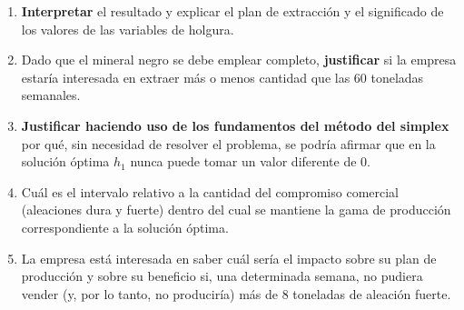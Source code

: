 \begin{enumerate}

\item \textbf{Interpretar} el resultado y explicar el plan de extracción y el significado de los valores de las variables de holgura.


\item Dado que el mineral negro se debe emplear completo, \textbf{justificar} si la empresa estaría interesada en extraer más o menos cantidad que las 60 toneladas semanales.

\item \textbf{Justificar haciendo uso de los fundamentos del método del simplex} por qué, sin necesidad de resolver el problema, se podría afirmar que en la solución óptima $h_1$ nunca puede tomar un valor diferente de 0.

\item Cuál es el intervalo relativo a la cantidad del compromiso comercial (aleaciones dura y fuerte) dentro del cual se mantiene la gama de producción correspondiente a la solución óptima.

\item La empresa está interesada en saber cuál sería el impacto sobre su plan de producción y sobre su beneficio si, una determinada semana, no pudiera vender (y, por lo tanto, no produciría) más de 8 toneladas de aleación fuerte.


\end{enumerate}



